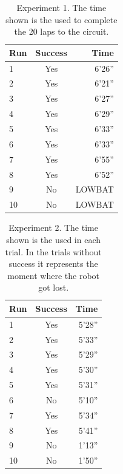 \begin{table}[H]
	\center
	
	\begin{tabular}{|l|c|r|}
		\hline
		Run & Success & Time	\\
		\hline
		1 	& Yes & 6'26'' \\
		2 	& Yes & 6'21'' \\
		3 	& Yes & 6'27'' \\
		4 	& Yes & 6'29'' \\
		5 	& Yes & 6'33'' \\
		6 	& Yes & 6'33'' \\
		7 	& Yes & 6'55'' \\
		8 	& Yes & 6'52'' \\
		9 	& No & LOWBAT \\
		10 	& No & LOWBAT \\	
		\hline
	\end{tabular}

	\caption{Experiment 1. The time shown is the used to complete the 20 laps to the circuit.}
	\label{tab:Experiment1}
\end{table}

\begin{table}[H]
	\center
	
	\begin{tabular}{|l|c|r|}
		\hline
		Run & Success & Time	\\
		\hline
		1 	& Yes & 5'28'' \\
		2 	& Yes & 5'33'' \\
		3 	& Yes & 5'29'' \\
		4 	& Yes & 5'30'' \\
		5 	& Yes & 5'31'' \\
		6 	& No & 5'10'' \\
		7 	& Yes & 5'34'' \\
		8 	& Yes & 5'41'' \\
		9 	& No & 1'13'' \\
		10 	& No & 1'50'' \\	
		\hline
	\end{tabular}

	\caption{Experiment 2. The time shown is the used in each trial. In the trials without success it represents the moment where the robot got lost.}
	\label{tab:Experiment2}
\end{table}


